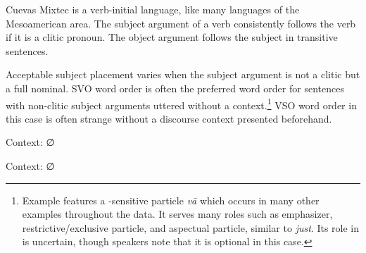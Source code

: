 \documentclass[output=paper,modfonts,nonflat]{langsci/langscibook}
\begin{document}
Cuevas Mixtec is a verb-initial language, like many languages of the Mesoamerican area.  The subject argument of a verb consistently follows the verb if it is a clitic pronoun.  The object argument follows the subject in transitive sentences.
 
\z 

\z 

Acceptable subject placement varies when the subject argument is not a clitic but a full nominal.  SVO word order is often the preferred word order for sentences with non-clitic subject arguments uttered without a  context.\footnote{Example  features a -sensitive particle \textit{v\=a} which occurs in many other examples throughout the data.  It serves many roles such as emphasizer, restrictive/exclusive particle, and aspectual particle, similar to  \textit{just}.  Its role in  is uncertain, though speakers note that it is optional in this case.}  VSO word order in this case is often strange without a discourse context presented beforehand.\newpage

\ea {}\label{ex:cisneros:18}
Context: ∅
\z 
\z

\ea {}\label{ex:cisneros:19}
Context: ∅
\end{document}
